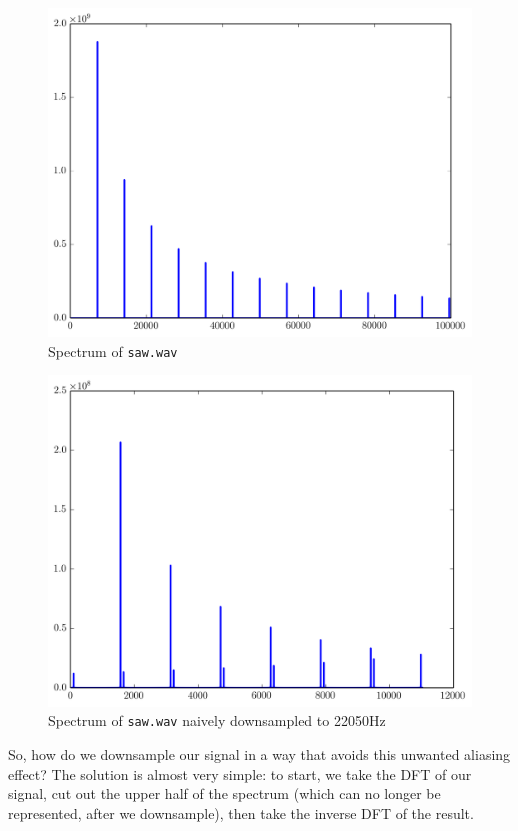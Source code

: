 \begin{figure}[ht]\caption{Spectrum of \texttt{saw.wav}}\label{sawspec}\centering\includegraphics[width=\textwidth]{sawspec}\end{figure}

\begin{figure}[ht]\caption{Spectrum of \texttt{saw.wav} naively downsampled to 22050Hz}\label{sawspecdown}\centering\includegraphics[width=\textwidth]{sawspecdown}\end{figure}

So, how do we downsample our signal in a way that avoids this unwanted aliasing effect? The solution is almost very simple: to start, we take the DFT of our signal, cut out the upper half of the spectrum (which can no longer be represented, after we downsample), then take the inverse DFT of the result.

